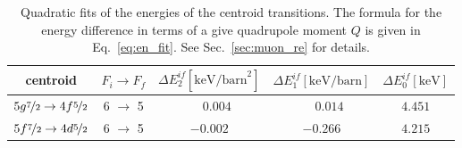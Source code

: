 \begin{table}[b]
\caption{\label{tab:re185centroid}%
Quadratic fits of the energies of the centroid transitions. The formula for the energy difference in terms of a give quadrupole moment $Q$ is given in Eq.~\eqref{eq:en_fit}. See Sec.~\ref{sec:muon_re} for details.}
\centering
\begin{small}
\begin{tabular}{cc|ccc}
centroid& $F_i \rightarrow F_f$ & $\Delta E_2^{if} [\text{keV/barn}^2]$ & $\Delta E_1^{if} [\text{keV/barn}]$ & $\Delta E_0^{if} [\text{keV}]$\\[1pt]\hline%
$5g\nicefrac{7}{2} \rightarrow 4f\nicefrac{5}{2}$ &6 $\rightarrow$ 5&$\phantom{-}0.004$&$\phantom{-}0.014$&$4.451$\\
$5f\nicefrac{7}{2} \rightarrow 4d\nicefrac{5}{2}$&6 $\rightarrow$ 5&$-0.002$&$-0.266$&$4.215$\\
\end{tabular}
\end{small}
\end{table}%
%
%
%
